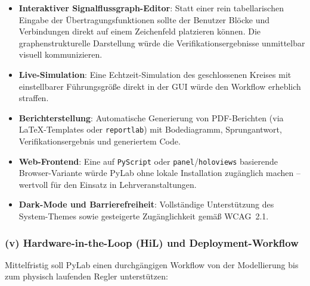\documentclass[a4paper,12pt]{article}
\theoremstyle{definition}
\begin{document}
\begin{itemize}
    \item \textbf{Interaktiver Signalflussgraph-Editor}: Statt einer rein
          tabellarischen Eingabe der Über\-tragungs\-funktionen sollte der Benutzer
          Blöcke und Verbindungen direkt auf einem Zeichenfeld platzieren können.
          Die graphen\-strukturelle Darstellung würde die Verifikations\-ergebnisse
          unmittelbar visuell kommunizieren.
    \item \textbf{Live-Simulation}: Eine Echtzeit-Simulation des geschlossenen
          Kreises mit einstellbarer Führungsgröße direkt in der GUI würde den
          Workflow erheblich straffen.
    \item \textbf{Berichterstellung}: Automatische Generierung von PDF-Berichten
          (via \LaTeX-Templates oder \texttt{reportlab}) mit Bodediagramm,
          Sprungantwort, Verifikationsergebnis und generiertem Code.
    \item \textbf{Web-Frontend}: Eine auf \texttt{PyScript} oder
          \texttt{panel}/\texttt{holoviews} basierende Browser-Variante würde
          PyLab ohne lokale Installation zugänglich machen -- wertvoll für den
          Einsatz in Lehr\-veranstaltungen.
    \item \textbf{Dark-Mode und Barrierefreiheit}: Vollständige Unterstützung
          des System-Themes sowie gesteigerte Zugänglichkeit gemäß WCAG~2.1.
\end{itemize}

\subsubsection*{(v) Hardware-in-the-Loop (HiL) und Deployment-Workflow}

Mittelfristig soll PyLab einen durchgängigen Workflow von der Modellierung bis
zum physisch laufenden Regler unterstützen:
\end{document}
